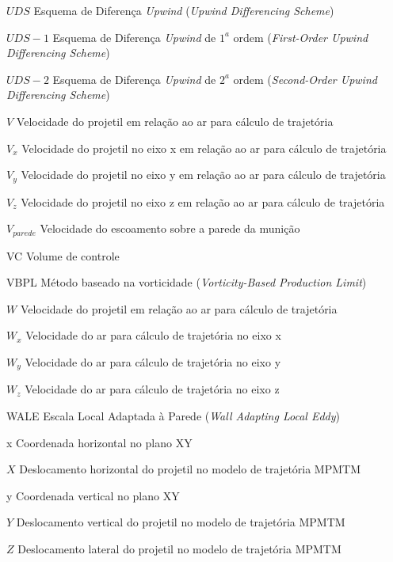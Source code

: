 \begin{siglas}
    \item[\(UDS\)] Esquema de Diferença \textit{Upwind} (\textit{Upwind Differencing Scheme})
    \item[\(UDS-1\)] Esquema de Diferença \textit{Upwind} de $1^a$ ordem (\textit{First-Order Upwind Differencing Scheme})
    \item[\(UDS-2\)] Esquema de Diferença \textit{Upwind} de $2^a$ ordem (\textit{Second-Order Upwind Differencing Scheme})
    \item[\(V\)] Velocidade do projetil em relação ao ar para cálculo de trajetória
    \item[\(V_x\)] Velocidade do projetil no eixo x em relação ao ar para cálculo de trajetória
    \item[\(V_y\)] Velocidade do projetil no eixo y em relação ao ar para cálculo de trajetória
    \item[\(V_z\)] Velocidade do projetil no eixo z em relação ao ar para cálculo de trajetória
    \item[\(V_{parede}\)] Velocidade do escoamento sobre a parede da munição
    \item[VC] Volume de controle
    \item[VBPL] Método baseado na vorticidade (\textit{Vorticity-Based Production Limit})
    \item[\(W\)] Velocidade do projetil em relação ao ar para cálculo de trajetória
    \item[\(W_x\)] Velocidade do ar para cálculo de trajetória no eixo x
    \item[\(W_y\)] Velocidade do ar para cálculo de trajetória no eixo y
    \item[\(W_z\)] Velocidade do ar para cálculo de trajetória no eixo z
    \item[WALE] Escala Local Adaptada à Parede (\textit{Wall Adapting Local Eddy})
    \item[x] Coordenada horizontal no plano XY
    \item[\(X\)] Deslocamento horizontal do projetil no modelo de trajetória MPMTM
    \item[y] Coordenada vertical no plano XY
    \item[\(Y\)] Deslocamento vertical do projetil no modelo de trajetória MPMTM
    \item[\(Z\)] Deslocamento lateral do projetil no modelo de trajetória MPMTM
\end{siglas}


